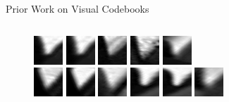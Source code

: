 \documentclass[mathserif]{beamer}
\begin{document}
\begin{frame}{Prior Work on Visual Codebooks}
\begin{columns}
\begin{column}{.5\textwidth}
\begin{figure}
                \includegraphics[width=.5cm]{illustrations/related_work/video_google/video_google_dict1_8}
                \includegraphics[width=.5cm]{illustrations/related_work/video_google/video_google_dict1_9}
                \includegraphics[width=.5cm]{illustrations/related_work/video_google/video_google_dict1_10}
                \includegraphics[width=.5cm]{illustrations/related_work/video_google/video_google_dict1_11}
                \includegraphics[width=.5cm]{illustrations/related_work/video_google/video_google_dict1_12}\\
                \includegraphics[width=.5cm]{illustrations/related_work/video_google/video_google_dict1_13}
                \includegraphics[width=.5cm]{illustrations/related_work/video_google/video_google_dict1_14}
                \includegraphics[width=.5cm]{illustrations/related_work/video_google/video_google_dict1_15}
                \includegraphics[width=.5cm]{illustrations/related_work/video_google/video_google_dict1_16}
                \includegraphics[width=.5cm]{illustrations/related_work/video_google/video_google_dict1_17}
                \includegraphics[width=.5cm]{illustrations/related_work/video_google/video_google_dict1_18}\\

\end{figure}
\end{column}
\end{columns}
\end{frame}
\end{document}
